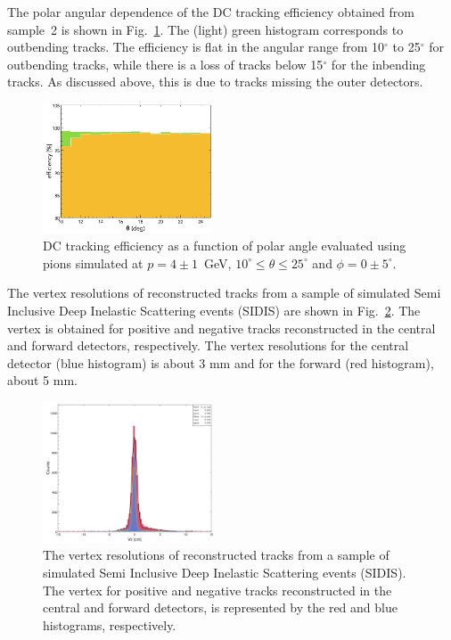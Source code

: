 The polar angular dependence of the DC tracking efficiency obtained from sample~2 is shown in
Fig.~\ref{fig:trkeffinoutb}. The (light) green histogram corresponds to outbending tracks. The efficiency is flat
in the angular range from 10$^\circ$ to 25$^\circ$ for outbending tracks, while there is a loss of tracks below
15$^\circ$ for the inbending tracks. As discussed above, this is due to tracks missing the outer detectors.  
\begin{figure}[t]
\includegraphics[width=0.45\textwidth]{pics/DCTrkEffvsThetaInandOutbenders.png}
\caption{DC tracking efficiency as a function of polar angle evaluated using  pions  simulated at $p=4\pm 1$~GeV,
  $10^\circ \leq \theta \leq 25^\circ$ and $\phi = 0 \pm 5^\circ$.}
\label{fig:trkeffinoutb}
\end{figure}

The vertex resolutions of reconstructed tracks from a sample of simulated Semi Inclusive Deep Inelastic Scattering events (SIDIS) are shown in Fig.~\ref{fig:vtxres}.  The vertex is obtained for positive and negative tracks reconstructed  in the central and forward detectors, respectively.  The vertex resolutions for the central detector (blue histogram) is about 3 mm and for the forward (red histogram), about 5 mm. 
\begin{figure}[ht]
\includegraphics[width=0.45\textwidth]{pics/VertexResolution.png}
\caption{The vertex resolutions of reconstructed tracks from a sample of simulated Semi Inclusive Deep Inelastic Scattering events (SIDIS).  The vertex for positive and negative tracks reconstructed  in the central and forward detectors, is represented by the red and blue histograms, respectively.}
\label{fig:vtxres}
\end{figure}

